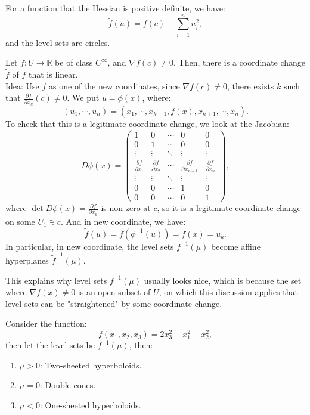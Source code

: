 \documentclass[11pt]{article}
\newenvironment{example}[1]{\begin{exbox}{#1}{}}{\end{exbox}}
\theoremstyle{quiet}
\theoremstyle{quietremark}
\begin{document}
\begin{example}{}
For a function that the Hessian is positive definite, we have:
\[
\tilde f(u)=f(c)+\sum_{i=1}^nu_i^2,
\]
and the level sets are circles.
\end{example}

\begin{example}{}
Let $f:U\to\mathbb{R}$ be of class $C^\infty$, and $\nabla f(c)\ne 0$. Then, there is a coordinate change $\tilde f$ of $f$ that is linear.\\
Idea: Use $f$ as one of the new coordinates, since $\nabla f(c)\ne 0$, there exists $k$ such that $\frac{\partial f}{\partial x_k}(c)\ne 0$. We put $u=\phi(x)$, where:
\[
(u_1,\cdots,u_n)=(x_1,\cdots,x_{k-1},f(x),x_{k+1},\cdots,x_n).
\]
To check that this is a legitimate coordinate change, we look at the Jacobian:
\[
D\phi(x)=\begin{pmatrix}1&0&\cdots &0&0\\0&1&\cdots&0&0\\\vdots&\vdots&\ddots&\vdots&\vdots\\\frac{\partial f}{\partial x_1}&\frac{\partial f}{\partial x_2}&\cdots&\frac{\partial f}{\partial x_{n-1}}&\frac{\partial f}{\partial x_n}\\\vdots&\vdots&\ddots&\vdots&\vdots\\0&0&\cdots&1&0\\0&0&\cdots&0&1\end{pmatrix},
\]
where $\det D\phi(x)=\frac{\partial f}{\partial x_k}$ is non-zero at $c$, so it is a legitimate coordinate change on some $U_1\ni c$. And in new coordinate, we have:
\[
\tilde f(u)=f(\phi^{-1}(u))=f(x)=u_k.
\]
In particular, in new coordinate, the level sets $f^{-1}(\mu)$ become affine hyperplanes $\tilde f^{-1}(\mu)$.
\end{example}
This explains why level sets $f^{-1}(\mu)$ usually looks nice, which is because the set where $\nabla f(x)\ne 0$ is an open subset of $U$, on which this discussion applies that level sets can be "straightened" by some coordinate change.

\begin{example}{}
Consider the function:
\[
f(x_1,x_2,x_3)=2x_3^2-x_1^2-x_2^2,
\]
then let the level sets be $f^{-1}(\mu)$, then:
\begin{enumerate}
\item $\mu>0$: Two-sheeted hyperboloids.
\item $\mu=0$: Double cones.
\item $\mu<0$: One-sheeted hyperboloids.
\end{enumerate}
\end{example}
\end{document}
